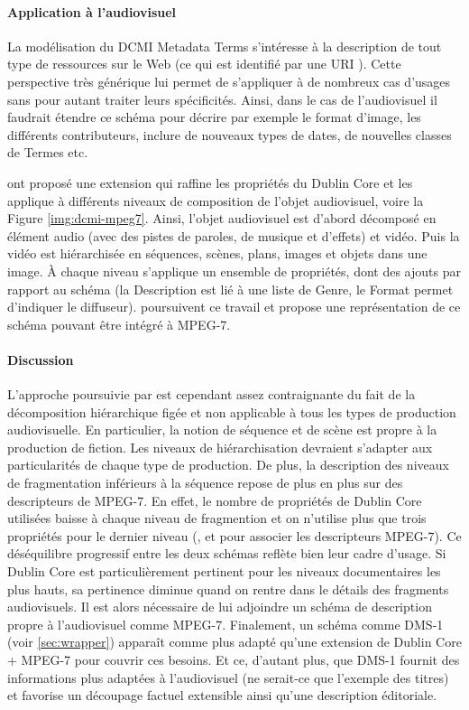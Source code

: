 \paragraph{Application à l'audiovisuel}
La modélisation du DCMI Metadata Terms s'intéresse à la description de tout type de ressources sur le Web (ce qui est identifié par une URI \cite{Berners-Lee1998}).
Cette perspective très générique lui permet de s'appliquer à de nombreux cas d'usages sans pour autant traiter leurs spécificités. 
Ainsi, dans le cas de l'audiovisuel il faudrait étendre ce schéma pour décrire par exemple le format d'image, les différents contributeurs, inclure de nouveaux types de dates, de nouvelles classes de Termes etc.

\cite{Hunter1998} ont proposé une extension qui raffine les propriétés du Dublin Core et les applique à différents niveaux de composition de l'objet audiovisuel, voire la Figure \ref{img:dcmi-mpeg7}.
Ainsi, l'objet audiovisuel est d'abord décomposé en élément audio (avec des pistes de paroles, de musique et d'effets) et vidéo.
Puis la vidéo est hiérarchisée en séquences, scènes, plans, images et objets dans une image.
À chaque niveau s'applique un ensemble de propriétés, dont des ajouts par rapport au schéma (la Description est lié à une liste de Genre, le Format permet d'indiquer le diffuseur).
\cite{Hunter1999} poursuivent ce travail et propose une représentation de ce schéma pouvant être intégré à MPEG-7. 


\paragraph{Discussion}
L'approche poursuivie par \cite{Hunter1999} est cependant assez contraignante du fait de la décomposition hiérarchique figée et non applicable à tous les types de production audiovisuelle.
En particulier, la notion de séquence et de scène est propre à la production de fiction. 
Les niveaux de hiérarchisation devraient s'adapter aux particularités de chaque type de production. 
De plus, la description des niveaux de fragmentation inférieurs à la séquence repose de plus en plus sur des descripteurs de MPEG-7. 
En effet, le nombre de propriétés de Dublin Core utilisées baisse à chaque niveau de fragmention et on n'utilise plus que trois propriétés pour le dernier niveau (,  et  pour associer les descripteurs MPEG-7).
Ce déséquilibre progressif entre les deux schémas reflète bien leur cadre d'usage. 
Si Dublin Core est particulièrement pertinent pour les niveaux documentaires les plus hauts, sa pertinence diminue quand on rentre dans le détails des fragments audiovisuels.
Il est alors nécessaire de lui adjoindre un schéma de description propre à l'audiovisuel comme MPEG-7.
Finalement, un schéma comme DMS-1 (voir \ref{sec:wrapper}) apparaît comme plus adapté qu'une extension de Dublin Core + MPEG-7 pour couvrir ces besoins.
Et ce, d'autant plus, que DMS-1 fournit des informations plus adaptées à l'audiovisuel (ne serait-ce que l'exemple des titres) et favorise un découpage factuel extensible ainsi qu'une description éditoriale.



